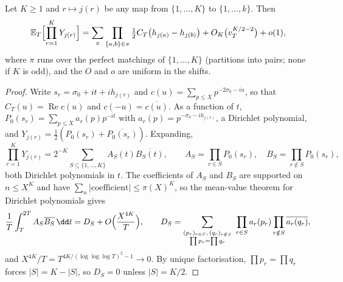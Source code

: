 \begin{lemma}\label{lem:jointmoments}
Let $K\ge1$ and $r\mapsto j(r)$ be any map from $\{1,\dots,K\}$ to $\{1,\dots,k\}$. Then
\[
\mathbb E_T\Bigl[\prod_{r=1}^KY_{j(r)}\Bigr]=\sum_{\pi}\prod_{\{a,b\}\in\pi}\tfrac12C_T\bigl(h_{j(a)}-h_{j(b)}\bigr)+O_K\bigl(v_T^{K/2-2}\bigr)+o(1),
\]
where $\pi$ runs over the perfect matchings of $\{1,\dots,K\}$ (partitions into pairs; none if $K$ is odd), and the $O$ and $o$ are uniform in the shifts.
\end{lemma}

\begin{proof}
Write $s_r=\sigma_0+it+ih_{j(r)}$ and $c(u)=\sum_{p\le X}p^{-2\sigma_0-iu}$, so that $C_T(u)=\operatorname{Re}c(u)$ and $c(-u)=\overline{c(u)}$. As a function of $t$, $P_0(s_r)=\sum_{p\le X}a_r(p)p^{-it}$ with $a_r(p)=p^{-\sigma_0-ih_{j(r)}}$, a Dirichlet polynomial, and $Y_{j(r)}=\frac12(P_0(s_r)+\overline{P_0(s_r)})$. Expanding,
\[
\prod_{r=1}^KY_{j(r)}=2^{-K}\sum_{S\subseteq\{1,\dots,K\}}A_S(t)\overline{B_S(t)},\qquad A_S=\prod_{r\in S}P_0(s_r),\quad B_S=\prod_{r\notin S}P_0(s_r),
\]
both Dirichlet polynomials in $t$. The coefficients of $A_S$ and $B_S$ are supported on $n\le X^K$ and have $\sum_n|\text{coefficient}|\le\pi(X)^K$, so the mean-value theorem for Dirichlet polynomials gives
\[
\frac1T\int_T^{2T}A_S\overline{B_S}\,\dd t=D_S+O\Bigl(\frac{X^{4K}}T\Bigr),\qquad D_S=\sum_{\substack{(p_r)_{r\in S},\,(q_r)_{r\notin S}\\\prod p_r=\prod q_r}}\ \prod_{r\in S}a_r(p_r)\prod_{r\notin S}\overline{a_r(q_r)},
\]
and $X^{4K}/T=T^{4K/(\log\log\log T)^2-1}\to0$. By unique factorisation, $\prod p_r=\prod q_r$ forces $|S|=K-|S|$, so $D_S=0$ unless $|S|=K/2$.


\end{proof}
